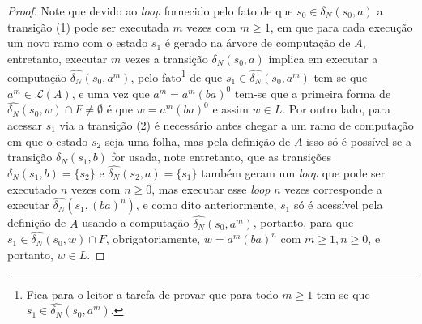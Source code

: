 \begin{exem}
\begin{proof}
		Note que devido ao \textit{loop} fornecido pelo fato de que $s_0 \in \delta_N(s_0, a)$ a transição (1) pode ser executada $m$ vezes com $m \geq 1$, em que para cada execução um novo ramo com o estado $s_1$ é gerado na árvore de computação de $A$, entretanto, executar $m$ vezes a transição $\delta_N(s_0, a)$ implica em executar a computação $\widehat{\delta_N}(s_0, a^m)$, pelo fato\footnote{Fica para o leitor a tarefa de provar que para todo $m \geq 1$ tem-se que $s_1 \in \widehat{\delta_N}(s_0, a^m)$.} de que $s_1 \in \widehat{\delta_N}(s_0, a^m)$ tem-se que $a^m \in \mathcal{L}(A)$, e uma vez que $a^m = a^m(ba)^0$ tem-se que a primeira forma de $\widehat{\delta_N}(s_0, w) \cap F \neq \emptyset$ é que $w = a^m(ba)^0$ e assim $w \in L$. Por outro lado, para acessar $s_1$ via a transição (2) é necessário antes chegar a um ramo de computação em que o estado $s_2$ seja uma folha, mas pela definição de $A$ isso só é possível se a transição $\delta_N(s_1, b)$ for usada, note entretanto, que as transições $\delta_N(s_1, b) = \{s_2\}$ e $\widehat{\delta_N}(s_2, a) = \{s_1\}$ também geram um \textit{loop} que pode ser executado $n$ vezes com $n \geq 0$, mas executar esse \textit{loop} $n$ vezes corresponde a executar $\widehat{\delta_N}(s_1, (ba)^n)$, e como dito anteriormente, $s_1$ só é acessível pela definição de $A$ usando a computação $\widehat{\delta_N}(s_0, a^m)$, portanto, para que $s_1 \in \widehat{\delta_N}(s_0, w) \cap F$, obrigatoriamente, $w = a^m(ba)^n$ com $m \geq 1, n \geq 0$, e portanto, $w \in L$.
	\end{proof}
\end{exem}

